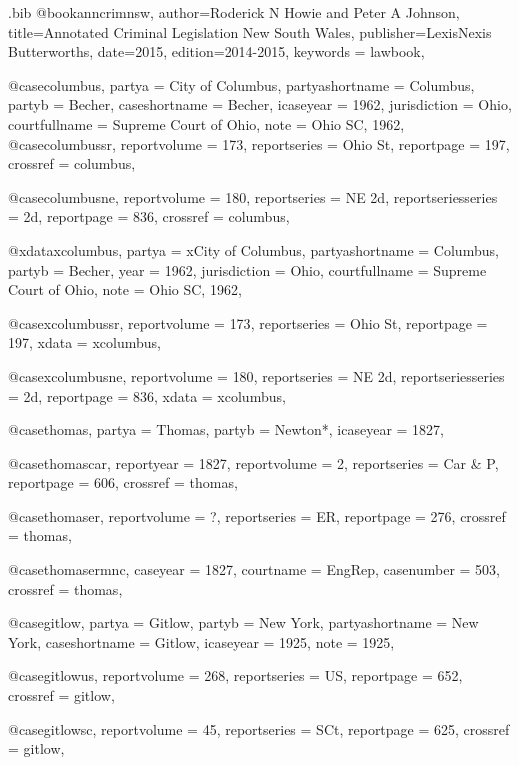 \begin{filecontents*}[overwrite]{\jobname.bib}
@book{anncrimnsw,
author={Roderick N Howie and Peter A Johnson},
title={Annotated Criminal Legislation New South Wales},
publisher={LexisNexis Butterworths},
date={2015},
edition={2014-2015},
keywords = {lawbook},
}

@case{columbus,
  partya = {City of Columbus},
  partyashortname = {Columbus}, 
  partyb = {Becher},
  caseshortname = {Becher},
  icaseyear = {1962},
  jurisdiction = {Ohio},
  courtfullname = {Supreme Court of Ohio},
  note = {Ohio SC, 1962},
	}
@case{columbussr,
  reportvolume = {173},
  reportseries = {Ohio St},
  reportpage = {197},
  crossref = {columbus},
}

@case{columbusne,
  reportvolume = {180},
  reportseries = {NE 2d},
  reportseriesseries = {2d},
  reportpage = {836},
  crossref = {columbus},
}

@xdata{xcolumbus,
  partya = {xCity of Columbus},
  partyashortname = {Columbus}, 
  partyb = {Becher},
  year = {1962},
  jurisdiction = {Ohio},
  courtfullname = {Supreme Court of Ohio},
  note = {Ohio SC, 1962},
	}
	
@case{xcolumbussr,
  reportvolume = {173},
  reportseries = {Ohio St},
  reportpage = {197},
  xdata = {xcolumbus},
}

@case{xcolumbusne,
  reportvolume = {180},
  reportseries = {NE 2d},
  reportseriesseries = {2d},
  reportpage = {836},
  xdata = {xcolumbus},
}


@case{thomas,
  partya = {Thomas},
  partyb = {Newton*},
  icaseyear = {1827},
	}

@case{thomascar,
  reportyear = {1827},
  reportvolume = {2},
  reportseries = {Car \& P},
  reportpage = {606},
  crossref = {thomas},
}

@case{thomaser,
  reportvolume = {?},
  reportseries = {ER},
  reportpage = {276},
  crossref = {thomas},
}

@case{thomasermnc,
  caseyear = {1827},
  courtname = {EngRep},
  casenumber = {503},
  crossref = {thomas},
}


@case{gitlow,
  partya = {Gitlow},
  partyb = {New York},%
  partyashortname = {New York}, 
  caseshortname = {Gitlow},
  icaseyear = {1925},
  note = {1925},
	}


@case{gitlowus,
  reportvolume = {268},
  reportseries = {US},
  reportpage = {652},
  crossref = {gitlow},
}


@case{gitlowsc,
  reportvolume = {45},
  reportseries = {SCt},
  reportpage = {625},
  crossref = {gitlow},
}


\end{filecontents*}
